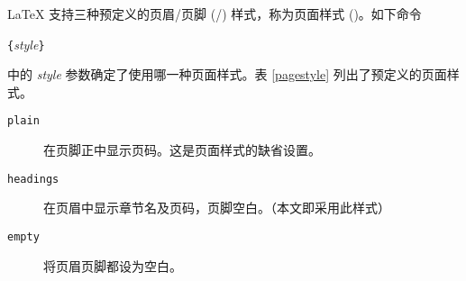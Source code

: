  

\LaTeX{} 支持三种预定义的页眉/页脚 (/) 样式，称为页面样式 ()。如下命令
\begin{lscommand}
\verb|{|\emph{style}\verb|}|
\end{lscommand}
\noindent%
中的 \emph{style} 参数确定了使用哪一种页面样式。表 \ref{pagestyle} 列出了预定义的页面样式。

%
%
%
\begin{table}[!hbp]
\caption{\LaTeX 预定义的页面样式。} \label{pagestyle}
\begin{lined}{\textwidth}
\begin{description}

\item[\normalfont\texttt{plain}] 在页脚正中显示页码。这是页面样式的缺省设置。

\item[\normalfont\texttt{headings}]
在页眉中显示章节名及页码，页脚空白。（本文即采用此样式）
\item[\normalfont\texttt{empty}] 将页眉页脚都设为空白。

\end{description}
\end{lined}
\end{table}

